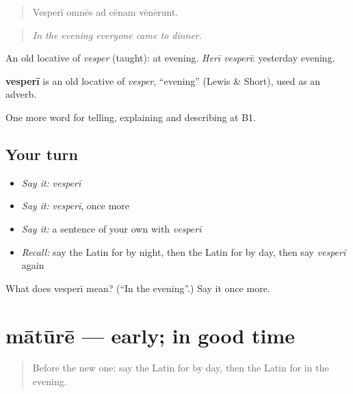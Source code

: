 \begin{quote}
Vesperī omnēs ad cēnam vēnērunt.
\end{quote}

\begin{quote}
\emph{In the evening everyone came to dinner.}
\end{quote}

An old locative of \emph{vesper} (taught): at evening. \emph{Herī vesperī}: yesterday evening.

\begin{cousinweb}
\textbf{vesperī} is an old locative of \emph{vesper}, \textquotedblleft{}evening\textquotedblright{} (Lewis \& Short), used as an adverb.
\end{cousinweb}

\begin{grammarlens}[title={What you've built}]
One more word for telling, explaining and describing at B1.
\end{grammarlens}

\subsection*{Your turn}
\begin{itemize}
\raggedright
  \item \emph{Say it:} \emph{vesperī}
  \item \emph{Say it:} \emph{vesperī}, once more
  \item \emph{Say it:} a sentence of your own with \emph{vesperī}
  \item \emph{Recall:} say the Latin for by night, then the Latin for by day, then say \emph{vesperī} again
\end{itemize}

\begin{tcolorbox}[breakable,colback=teal!4,colframe=teal!35!black,title={Before you move on}]
What does vesperī mean? (\textquotedblleft{}In the evening\textquotedblright{}.) Say it once more.
\end{tcolorbox}
\section[mātūrē]{mātūrē — early; in good time}

\label{lesson:LA-C295-mature}



\begin{quote}
Before the new one: say the Latin for by day, then the Latin for in the evening.
\end{quote}


